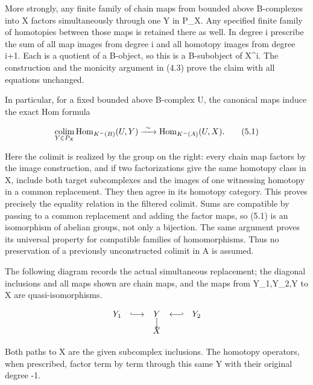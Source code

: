 \documentclass[11pt]{article}
\begin{document}
More strongly,\allowbreak{} any finite family of chain maps from bounded above B-complexes into X factors simultaneously through one Y in P\_\allowbreak{}X. Any specified finite family of homotopies between those maps is retained there as well. In degree i prescribe the sum of all map images from degree i and all homotopy images from degree i\allowbreak{}+1. Each is a quotient of a B-object,\allowbreak{} so this is a B-subobject of X\^{}i. The construction and the monicity argument in (4.3)\allowbreak{} prove the claim with all equations unchanged.

In particular,\allowbreak{} for a fixed bounded above B-complex U,\allowbreak{} the canonical maps induce the exact Hom formula

\[
 \mathop{\rm colim}_{Y\in P_X}
       \operatorname{Hom}_{K^-(B)}(U,Y)
       \xrightarrow{\ \sim\ }
       \operatorname{Hom}_{K^-(A)}(U,X).                  \tag{5.1}
\]

Here the colimit is realized by the group on the right:\allowbreak{} every chain map factors by the image construction,\allowbreak{} and if two factorizations give the same homotopy class in X,\allowbreak{} include both target subcomplexes and the images of one witnessing homotopy in a common replacement. They then agree in its homotopy category. This proves precisely the equality relation in the filtered colimit. Sums are compatible by passing to a common replacement and adding the factor maps,\allowbreak{} so (5.1)\allowbreak{} is an isomorphism of abelian groups,\allowbreak{} not only a bijection. The same argument proves its universal property for compatible families of homomorphisms. Thus no preservation of a previously unconstructed colimit in A is assumed.

The following diagram records the actual simultaneous replacement; the diagonal inclusions and all maps shown are chain maps,\allowbreak{} and the maps from Y\_\allowbreak{}1,\allowbreak{}Y\_\allowbreak{}2,\allowbreak{}Y to X are quasi-isomorphisms.

\[
 \begin{array}{ccccc}
 Y_1&\lhook\joinrel\longrightarrow&Y&\longleftarrow\joinrel\rhook&Y_2\\[-2pt]
 &&\big\downarrow&&\\[-2pt]
 &&X&&
 \end{array}
\]

Both paths to X are the given subcomplex inclusions. The homotopy operators,\allowbreak{} when prescribed,\allowbreak{} factor term by term through this same Y with their original degree -1.
\end{document}
